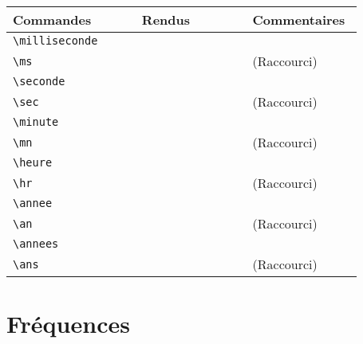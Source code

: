\documentclass[a4paper,12pt]{article}
\newcommand{\rac}{({\color{red}Raccourci})}
\begin{document}
	\noindent
	\begin{tabular}{|p{0.35\linewidth}|p{0.3\linewidth}|p{0.3\linewidth}|}
		\hline
 			\textbf{Commandes}&\textbf{Rendus}&\textbf{Commentaires}
 		\\\hline\hline
			\verb!\milliseconde!	& 	\milliseconde	&	\\
		\hline
			\verb!\ms!		& 	\ms	&	\rac\\
		\hline
			\verb!\seconde!		& 	\seconde	&	\\
		\hline
			\verb!\sec!		& 	\sec	&	\rac\\
		\hline
			\verb!\minute!		& 	\minute	&	\\
		\hline
			\verb!\mn!		& 	\mn	&	\rac\\
		\hline
			\verb!\heure!		& 	\heure	&	\\
		\hline
			\verb!\hr!		& 	\hr	&	\rac\\
		\hline
			\verb!\annee!		& 	\annee		&	\\
		\hline
			\verb!\an!		& 	\an	&	\rac\\
		\hline
			\verb!\annees!		& 	\annees	&	\\
		\hline
			\verb!\ans!		& 	\ans		&	\rac\\
		\hline
	\end{tabular}
	
	
		
	
	\section{Fréquences}
	
\end{document}
